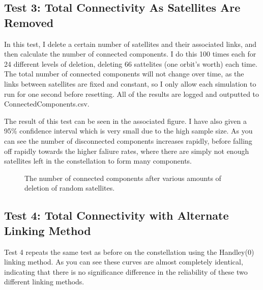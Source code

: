 \documentclass[12pt]{article}
\begin{document}
\subsection{Test 3: Total Connectivity As Satellites Are Removed}

In this test, I delete a certain number of satellites and their associated links, and then calculate the number of connected components. I do this 100 times each for 24 different levels of deletion, deleting 66 sattelites (one orbit's worth) each time. The total number of connected components will not change over time, as the links between satellites are fixed and constant, so I only allow each simulation to run for one second before resetting. All of the results are logged and outputted to ConnectedComponents.csv.

The result of this test can be seen in the associated figure. I have also given a 95\% confidence interval which is very small due to the high sample size. As you can see the number of disconnected components increases rapidly, before falling off rapidly towards the higher faliure rates, where there are simply not enough satellites left in the constellation to form many components.

\begin{figure}
\label{fig:Connected Components After Deletions}
\caption{The number of connected components after various amounts of deletion of random satellites.}
\end{figure}

\subsection{Test 4: Total Connectivity with Alternate Linking Method}

Test 4 repeats the same test as before on the constellation using the Handley(0) linking method. As you can see these curves are almost completely identical, indicating that there is no significance difference in the reliability of these two different linking methods.
\end{document}
